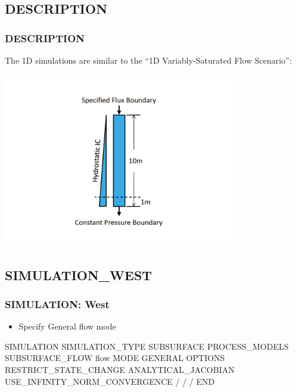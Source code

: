 \documentclass{beamer}
\begin{document}
\subsection{DESCRIPTION}

\begin{frame}[fragile]\frametitle{DESCRIPTION}

The 1D simulations are similar to the ``1D Variably-Saturated Flow Scenario'':

\includegraphics[height=3in]{../../1D_variably_saturated_flow/doc/vsat_flow_uniform.pdf}

\end{frame}

\subsection{SIMULATION\_WEST}

\begin{frame}[fragile]\frametitle{SIMULATION: West}

\begin{itemize}
\item Specify General flow mode
\end{itemize}


\begin{semiverbatim}

SIMULATION
  SIMULATION_TYPE SUBSURFACE
  PROCESS_MODELS
    SUBSURFACE_FLOW flow
      MODE GENERAL
      OPTIONS
        RESTRICT_STATE_CHANGE
        ANALYTICAL_JACOBIAN
        USE_INFINITY_NORM_CONVERGENCE
      /
    /
  /
END
\end{semiverbatim}

\end{frame}
\end{document}
